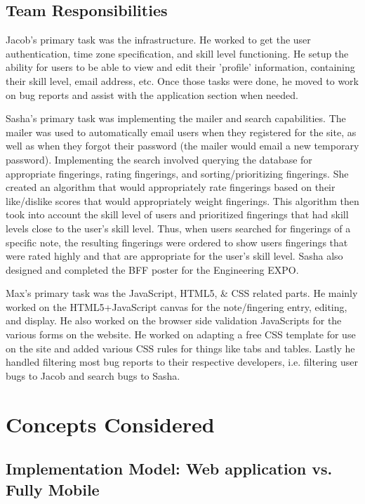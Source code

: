 \documentclass[12pt,english]{article}
\begin{document}
\subsection{Team Responsibilities}

Jacob's primary task was the infrastructure. He worked to get the
user authentication, time zone specification, and skill level functioning.
He setup the ability for users to be able to view and edit their 'profile'
information, containing their skill level, email address, etc. Once
those tasks were done, he moved to work on bug reports and assist
with the application section when needed.

Sasha's primary task was implementing the mailer and search capabilities.
The mailer was used to automatically email users when they registered
for the site, as well as when they forgot their password (the mailer
would email a new temporary password). Implementing the search involved
querying the database for appropriate fingerings, rating fingerings,
and sorting/prioritizing fingerings. She created an algorithm that
would appropriately rate fingerings based on their like/dislike scores
that would appropriately weight fingerings. This algorithm then took
into account the skill level of users and prioritized fingerings that
had skill levels close to the user's skill level. Thus, when users
searched for fingerings of a specific note, the resulting fingerings
were ordered to show users fingerings that were rated highly and that
are appropriate for the user's skill level. Sasha also designed and
completed the BFF poster for the Engineering EXPO. 

Max's primary task was the JavaScript, HTML5, \& CSS related parts.
He mainly worked on the HTML5+JavaScript canvas for the note/fingering
entry, editing, and display. He also worked on the browser side validation
JavaScripts for the various forms on the website. He worked on adapting
a free CSS template for use on the site and added various CSS rules
for things like tabs and tables. Lastly he handled filtering most
bug reports to their respective developers, i.e. filtering user bugs
to Jacob and search bugs to Sasha.


\section{Concepts Considered}


\subsection{Implementation Model: Web application vs. Fully Mobile}
\end{document}
